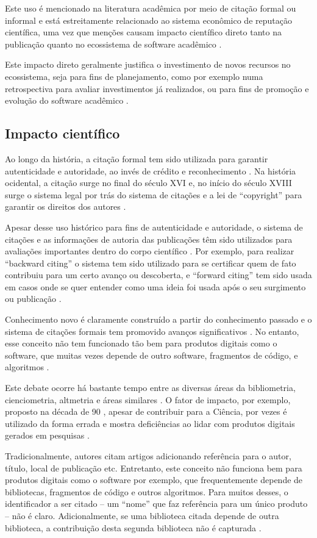 Este uso é mencionado na literatura acadêmica por meio de citação formal ou informal
\cite{smith2016software} e está estreitamente relacionado ao sistema
econômico de reputação científica, uma vez que
menções causam
impacto científico direto tanto na publicação quanto no ecossistema de software
acadêmico \cite{katz2014transitive}.

Este impacto direto geralmente justifica o investimento de novos recursos no
ecossistema, seja para fins de planejamento, como por exemplo numa retrospectiva para avaliar
investimentos já realizados, ou para fins de promoção e evolução do software acadêmico
\cite{howison2015understanding}.

\subsection{Impacto científico}

Ao longo da história, a citação formal tem sido utilizada para garantir
autenticidade e autoridade, ao invés de crédito e reconhecimento
\cite{katz2014transitive}.
Na história ocidental, a citação surge no final do século XVI e, no início do
século XVIII surge o sistema legal por trás do sistema de citações e a lei de
``copyright'' para garantir os direitos dos autores \cite{katz2014transitive}.

Apesar desse uso histórico para fins de autenticidade e autoridade, o sistema de
citações e as informações de autoria das publicações têm sido
utilizados para avaliações importantes dentro do corpo científico
\cite{katz2014transitive}.
Por exemplo, para realizar ``backward citing'' o sistema tem sido utilizado para se certificar quem de
fato contribuiu para um certo avanço ou descoberta, e ``forward citing'' tem
sido usada em casos onde se quer entender como uma ideia foi usada após o seu
surgimento ou publicação \cite{katz2014transitive}.

Conhecimento novo é claramente construído a partir do conhecimento passado e o
sistema de citações formais tem promovido avanços significativos
\cite{katz2014transitive}.
No entanto, esse conceito não tem funcionado tão bem para produtos digitais
como o software, que muitas vezes depende de outro software, fragmentos de
código, e algoritmos \cite{katz2014transitive}.

Este debate ocorre há bastante tempo entre as diversas áreas da bibliometria,
cienciometria, altmetria e áreas similares \cite{gouveia2013altmetria}.  O
fator de impacto, por exemplo, proposto na década de 90
\cite{reuters2017history}, apesar de contribuir para a Ciência, por vezes é
utilizado da forma errada e mostra deficiências ao lidar com produtos digitais
gerados em pesquisas \cite{katz2014transitive}.

Tradicionalmente, autores citam artigos adicionando referência para o autor,
título, local de publicação etc. Entretanto, este conceito não funciona bem
para produtos digitais como o software por exemplo, que frequentemente depende
de bibliotecas, fragmentos de código e outros algoritmos. Para muitos desses, o
identificador a ser citado -- um ``nome'' que faz referência para um
único produto -- não é claro.  Adicionalmente, se uma biblioteca citada depende
de outra biblioteca, a contribuição desta segunda biblioteca não é capturada
\cite{katz2014transitive}.

